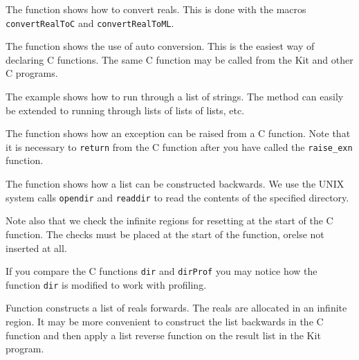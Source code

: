 \documentclass[12pt]{book}
\begin{document}
\begin{example}\label{power_real.ex}
  The  function shows how to convert reals. This is done
  with the macros \texttt{convertRealToC} and \texttt{convertRealToML}.
\end{example}

\begin{example}\label{power_auto.ex}
  The  function shows the use of auto conversion. This
  is the easiest way of declaring C functions. The same C function
  may be called from the Kit and other C programs.
\end{example}

\begin{example}\label{print_string_list.ex}
  The  example shows how to run through a list
  of strings. The method can easily be extended to running through lists of
  lists of lists, etc.
\end{example}

\begin{example}\label{power_exn.ex}
  The  function shows how an exception can be raised
  from a C function. Note that it is necessary to {\tt return} from the C
  function after you have called the \texttt{raise\_exn} function.
\end{example}

\begin{example}\label{dir.ex}
  The  function shows how a list can be constructed backwards.
  We use the UNIX system calls \texttt{opendir} and \texttt{readdir} to
  read the contents of the specified directory.
  
  Note also that we check the infinite regions for resetting at the start
  of the C function. The checks must be placed at the start of the
  function, orelse not inserted at all.
  
  If you compare the C functions \texttt{dir} and \texttt{dirProf} you may
  notice how the function \texttt{dir} is modified to work with
  profiling.
\end{example}

\begin{example}\label{real_list.ex}
  Function  constructs a list of
  reals forwards. The reals are allocated in an infinite region. It may be
  more convenient to construct the list backwards in the C function and
  then apply a list reverse function on the result list in the Kit
  program.
\end{example}
\end{document}

